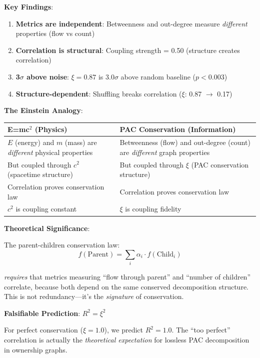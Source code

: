 \documentclass[11pt,a4paper]{article}
\begin{document}
\textbf{Key Findings}:
\begin{enumerate}
    \item \textbf{Metrics are independent}: Betweenness and out-degree measure \emph{different} properties (flow vs count)
    \item \textbf{Correlation is structural}: Coupling strength = 0.50 (structure creates correlation)
    \item \textbf{3$\sigma$ above noise}: $\xi = 0.87$ is $3.0\sigma$ above random baseline ($p<0.003$)
    \item \textbf{Structure-dependent}: Shuffling breaks correlation ($\xi$: 0.87 $\to$ 0.17)
\end{enumerate}

\textbf{The Einstein Analogy}:

\begin{center}
\begin{tabular}{|p{5.5cm}|p{5.5cm}|}
\hline
\textbf{E=mc$^2$ (Physics)} & \textbf{PAC Conservation (Information)} \\
\hline
$E$ (energy) and $m$ (mass) are \emph{different} physical properties & Betweenness (flow) and out-degree (count) are \emph{different} graph properties \\
\hline
But coupled through $c^2$ (spacetime structure) & But coupled through $\xi$ (PAC conservation structure) \\
\hline
Correlation proves conservation law & Correlation proves conservation law \\
\hline
$c^2$ is coupling constant & $\xi$ is coupling fidelity \\
\hline
\end{tabular}
\end{center}

\textbf{Theoretical Significance}:

The parent-children conservation law:
\begin{equation}
f(\text{Parent}) = \sum_i \alpha_i \cdot f(\text{Child}_i)
\end{equation}

\emph{requires} that metrics measuring ``flow through parent'' and ``number of children'' correlate, because both depend on the same conserved decomposition structure. This is not redundancy---it's the \emph{signature} of conservation.

\textbf{Falsifiable Prediction}: $R^2 = \xi^2$

For perfect conservation ($\xi = 1.0$), we predict $R^2 = 1.0$. The ``too perfect'' correlation is actually the \emph{theoretical expectation} for lossless PAC decomposition in ownership graphs.
\end{document}
